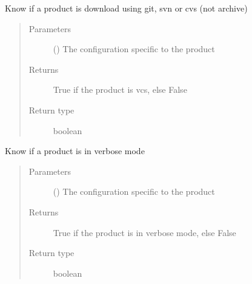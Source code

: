 \documentclass[a4paper,10pt,english]{sphinxmanual}
\begin{document}

\begin{fulllineitems}
\label{\detokenize{commands/apidoc/src:src.product.product_is_vcs}}
Know if a product is download using git, svn or cvs (not archive)
\begin{quote}\begin{description}
\item[{Parameters}] \leavevmode
{} () \textendash{} The configuration specific to 
the product

\item[{Returns}] \leavevmode
True if the product is vcs, else False

\item[{Return type}] \leavevmode
boolean

\end{description}\end{quote}

\end{fulllineitems}


\begin{fulllineitems}
\label{\detokenize{commands/apidoc/src:src.product.product_is_verbose}}
Know if a product is in verbose mode
\begin{quote}\begin{description}
\item[{Parameters}] \leavevmode
{} () \textendash{} The configuration specific to 
the product

\item[{Returns}] \leavevmode
True if the product is in verbose mode, else False

\item[{Return type}] \leavevmode
boolean

\end{description}\end{quote}

\end{fulllineitems}
\end{document}
